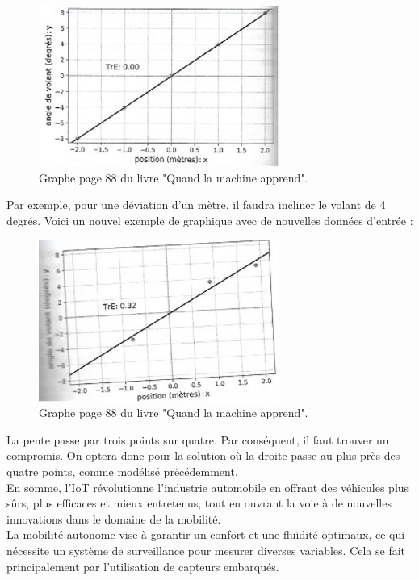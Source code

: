 \begin{figure}[H]
    \centering
    \includegraphics[width=0.7\textwidth]{images/graph1_yannLeCun.png} 
    \caption{Graphe page 88 du livre "Quand la machine apprend".}
\end{figure}
Par exemple, pour une déviation d’un mètre, il faudra incliner le volant de 4 degrés. 
Voici un nouvel exemple de graphique avec de nouvelles données d’entrée :
\begin{figure}[H]
    \centering
    \includegraphics[width=0.7\textwidth]{images/graph2_yannLeCun.jpg} 
    \caption{Graphe page 88 du livre "Quand la machine apprend".}
\end{figure}
La pente passe par trois points sur quatre. Par conséquent, il faut trouver un compromis. On optera donc pour la solution où la droite passe au plus près des quatre points, comme modélisé précédemment. \\
En somme, l’IoT révolutionne l’industrie automobile en offrant des véhicules plus sûrs, plus efficaces et mieux entretenus, tout en ouvrant la voie à de nouvelles innovations dans le domaine de la mobilité.\\
La mobilité autonome vise à garantir un confort et une fluidité optimaux, ce qui nécessite un système de surveillance pour mesurer diverses variables. Cela se fait principalement par l'utilisation de capteurs embarqués.\\
